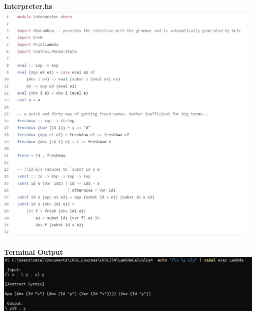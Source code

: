 \documentclass{article}
\theoremstyle{theorem}
\theoremstyle{definition}
\theoremstyle{remark}
\begin{document}
\begin{samepage}
  \begin{center}
    \textbf{Interpreter.hs}\\
    \includegraphics[width=13cm]{Week5hw_Interpreter.jpg}\\
  \end{center}
\end{samepage}

\begin{samepage}
  \begin{center}
    \textbf{Terminal Output}
    \includegraphics[width=15cm]{Week5hw_interpreterOutput.jpg}\\
  \end{center}
\end{samepage}
\end{document}
